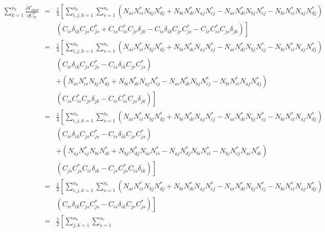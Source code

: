 \documentclass[pra]{revtex4-1}
\begin{document}
\begin{eqnarray}
  \sum_{k=1}^{n_b}\frac{\partial\Gamma_{abcd}}{\partial C^*_{kr}}
  &=& \frac{1}{4}\left[\sum_{i,j,k=1}^{n_b}\sum_{s=1}^{n_e}\left(
      N_{ai}N^*_{ci}N_{bj}N^*_{dj}+N_{bi}N^*_{di}N_{aj}N^*_{cj}
      -N_{ai}N^*_{di}N_{bj}N^*_{cj}-N_{bi}N^*_{ci}N_{aj}N^*_{dj}\right)\right.
      \nonumber \\
  &&  \left.\left(C_{ir}\delta_{ik}C_{js}C^*_{js}+C_{is}C^*_{is}C_{jr}\delta_{jk}
      -C_{is}\delta_{ik}C_{jr}C^*_{js}-C_{ir}C^*_{is}C_{js}\delta_{jk}\right)\right] \\
  &=& \frac{1}{4}\left[\sum_{i,j,k=1}^{n_b}\sum_{s=1}^{n_e}
      \left(
      N_{ai}N^*_{ci}N_{bj}N^*_{dj}+N_{bi}N^*_{di}N_{aj}N^*_{cj}
      -N_{ai}N^*_{di}N_{bj}N^*_{cj}-N_{bi}N^*_{ci}N_{aj}N^*_{dj}\right)\right.
      \nonumber \\
  &&  \left(C_{ir}\delta_{ik}C_{js}C^*_{js}-C_{is}\delta_{ik}C_{jr}C^*_{js}\right)
      \nonumber \\
  &&  +\left(
      N_{ai}N^*_{ci}N_{bj}N^*_{dj}+N_{bi}N^*_{di}N_{aj}N^*_{cj}
      -N_{ai}N^*_{di}N_{bj}N^*_{cj}-N_{bi}N^*_{ci}N_{aj}N^*_{dj}\right)
      \nonumber \\
  &&  \left.\left(C_{is}C^*_{is}C_{jr}\delta_{jk}-C_{ir}C^*_{is}C_{js}\delta_{jk}\right)\right] \\
  &=& \frac{1}{4}\left[\sum_{i,j,k=1}^{n_b}\sum_{s=1}^{n_e}
      \left(
      N_{ai}N^*_{ci}N_{bj}N^*_{dj}+N_{bi}N^*_{di}N_{aj}N^*_{cj}
      -N_{ai}N^*_{di}N_{bj}N^*_{cj}-N_{bi}N^*_{ci}N_{aj}N^*_{dj}\right)\right.
      \nonumber \\
  &&  \left(C_{ir}\delta_{ik}C_{js}C^*_{js}-C_{is}\delta_{ik}C_{jr}C^*_{js}\right)
      \nonumber \\
  &&  +\left(
      N_{aj}N^*_{cj}N_{bi}N^*_{di}+N_{bj}N^*_{dj}N_{ai}N^*_{ci}
      -N_{aj}N^*_{dj}N_{bi}N^*_{ci}-N_{bj}N^*_{cj}N_{ai}N^*_{di}\right)
      \nonumber \\
  &&  \left.\left(C_{js}C^*_{js}C_{ir}\delta_{ik}-C_{jr}C^*_{js}C_{is}\delta_{ik}\right)\right] \\
  &=& \frac{1}{2}\left[\sum_{i,j,k=1}^{n_b}\sum_{s=1}^{n_e}
      \left(
      N_{ai}N^*_{ci}N_{bj}N^*_{dj}+N_{bi}N^*_{di}N_{aj}N^*_{cj}
      -N_{ai}N^*_{di}N_{bj}N^*_{cj}-N_{bi}N^*_{ci}N_{aj}N^*_{dj}\right)\right.
      \nonumber \\
  &&  \left.\left(C_{ir}\delta_{ik}C_{js}C^*_{js}-C_{is}\delta_{ik}C_{jr}C^*_{js}\right)\right] \\
  &=& \frac{1}{2}\left[\sum_{j,k=1}^{n_b}\sum_{s=1}^{n_e}

\end{eqnarray}
\end{document}
